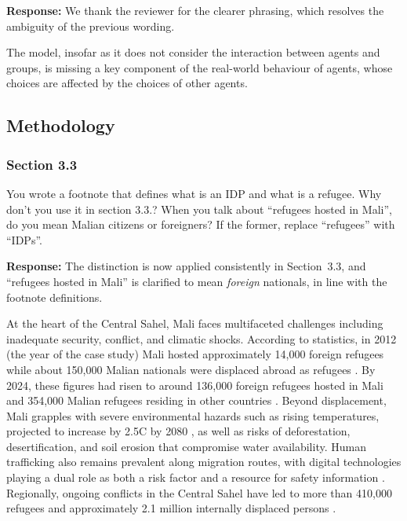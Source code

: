 \documentclass[11pt,a4paper]{article}
\begin{document}
\textbf{Response:} We thank the reviewer for the clearer phrasing, which resolves the ambiguity of the
previous wording.

\vspace{0.3cm}
\begin{updatebox}
The model, insofar as it does not consider the interaction between agents and groups, is missing a key
component of the real-world behaviour of agents, whose choices are affected by the choices of other agents.
\end{updatebox}

\subsection*{Methodology}

\subsubsection*{Section 3.3}

\begin{reviewbox}
You wrote a footnote that defines what is an IDP and what is a refugee. Why don't you use it in section 3.3.? When you talk about ``refugees hosted in Mali'', do you mean Malian citizens or foreigners? If the former, replace ``refugees'' with ``IDPs''.
\end{reviewbox}

\textbf{Response:} The distinction is now applied consistently in Section~3.3, and ``refugees hosted in Mali''
is clarified to mean \emph{foreign} nationals, in line with the footnote definitions.

\vspace{0.3cm}
\begin{updatebox}
At the heart of the Central Sahel, Mali faces multifaceted challenges including inadequate security, conflict, and
climatic shocks. According to \citet{unhcr_refugee_statistics_2025} statistics, in 2012 (the year of the case study)
Mali hosted approximately 14,000 foreign refugees while about 150,000 Malian nationals were displaced abroad as refugees
\citep{unhcr_mali}. By 2024, these figures had risen to around 136,000 foreign refugees hosted in Mali and 354,000 Malian
refugees residing in other countries \citep{unhcr_mali}. Beyond displacement, Mali grapples with severe environmental
hazards such as rising temperatures, projected to increase by 2.5\textdegree C by 2080 \citep{76-wachiaya2021warming}, as well as
risks of deforestation, desertification, and soil erosion that compromise water availability. Human trafficking also
remains prevalent along migration routes, with digital technologies playing a dual role as both a risk factor and a
resource for safety information \citep{UNHCR2022Trafficking}. Regionally, ongoing conflicts in the Central Sahel have
led to more than 410,000 refugees and approximately 2.1 million internally displaced persons \citep{80-cheshirkov2022decade}.
\end{updatebox}
\end{document}
